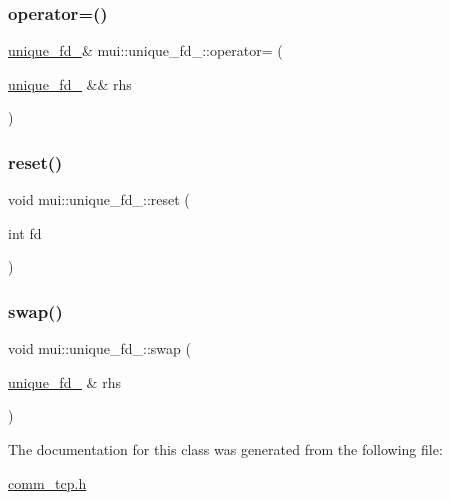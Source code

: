 \mbox{\label{classmui_1_1unique__fd___abca4e10942091e7a391796b3fcf72568}} 
\subsubsection{\texorpdfstring{operator=()}{operator=()}\hspace{0.1cm}{\footnotesize\ttfamily [2/2]}}
{\footnotesize\ttfamily \hyperlink{classmui_1_1unique__fd__}{unique\+\_\+fd\+\_\+}\& mui\+::unique\+\_\+fd\+\_\+\+::operator= (\begin{DoxyParamCaption}\item[{\hyperlink{classmui_1_1unique__fd__}{unique\+\_\+fd\+\_\+} \&\&}]{rhs }\end{DoxyParamCaption})\hspace{0.3cm}{\ttfamily [inline]}}

\mbox{\label{classmui_1_1unique__fd___aa7c178fe9dfc3932edd08bd9d863139e}} 
\subsubsection{\texorpdfstring{reset()}{reset()}}
{\footnotesize\ttfamily void mui\+::unique\+\_\+fd\+\_\+\+::reset (\begin{DoxyParamCaption}\item[{int}]{fd }\end{DoxyParamCaption})\hspace{0.3cm}{\ttfamily [inline]}}

\mbox{\label{classmui_1_1unique__fd___ae76b65f5ece4d1670923f78de93f04e9}} 
\subsubsection{\texorpdfstring{swap()}{swap()}}
{\footnotesize\ttfamily void mui\+::unique\+\_\+fd\+\_\+\+::swap (\begin{DoxyParamCaption}\item[{\hyperlink{classmui_1_1unique__fd__}{unique\+\_\+fd\+\_\+} \&}]{rhs }\end{DoxyParamCaption})\hspace{0.3cm}{\ttfamily [inline]}}



The documentation for this class was generated from the following file\+:\begin{DoxyCompactItemize}
\item 
\hyperlink{comm__tcp_8h}{comm\+\_\+tcp.\+h}\end{DoxyCompactItemize}
